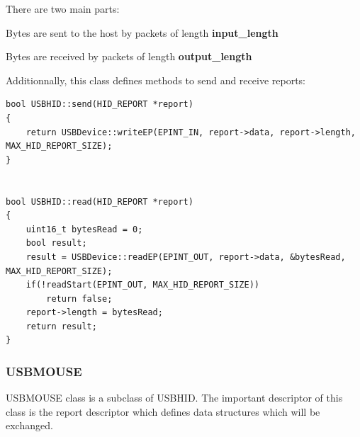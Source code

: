 \documentclass[pdftex,10pt,a4paper]{report}
\newenvironment{packed_item}{
\begin{itemize}
  \setlength{\itemsep}{1pt}
  \setlength{\parskip}{0pt}
  \setlength{\parsep}{0pt}
}{\end{itemize}}
\begin{document}
There are two main parts:
\begin{packed_item}
	\item Bytes are sent to the host by packets of length \textbf{input\_length}
	\item Bytes are received by packets of length \textbf{output\_length}
\end{packed_item}


Additionnally, this class defines methods to send and receive reports:

\begin{lstlisting}[label=Send and receive HID reports,caption=Send and receive HID reports]
bool USBHID::send(HID_REPORT *report)
{
    return USBDevice::writeEP(EPINT_IN, report->data, report->length, MAX_HID_REPORT_SIZE);
}


bool USBHID::read(HID_REPORT *report)
{
    uint16_t bytesRead = 0;
    bool result;
    result = USBDevice::readEP(EPINT_OUT, report->data, &bytesRead, MAX_HID_REPORT_SIZE);
    if(!readStart(EPINT_OUT, MAX_HID_REPORT_SIZE))
        return false;
    report->length = bytesRead;
    return result;
}
\end{lstlisting}

\subsubsection{USBMOUSE}
USBMOUSE class is a subclass of USBHID. The important descriptor of this class is the report descriptor which defines data structures which will be exchanged.
\end{document}
